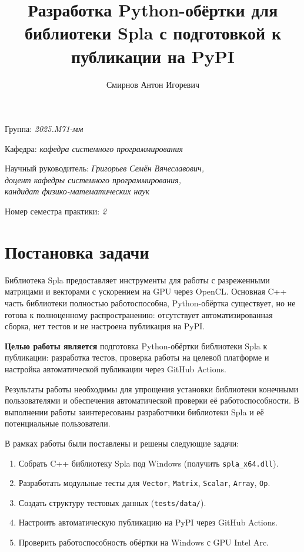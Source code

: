 \documentclass[a4paper]{article}
\title{Разработка Python-обёртки для библиотеки Spla с подготовкой к публикации на PyPI}
\author{Смирнов Антон Игоревич}
\date{}
\begin{document}
\maketitle

\begin{flushright}
    Группа: \emph{2025.M71-мм}

    Кафедра: \emph{кафедра системного программирования}

    Научный руководитель: \emph{Григорьев Семён Вячеславович,}\\
    \emph{доцент кафедры системного программирования,}\\
    \emph{кандидат физико-математических наук}

    Номер семестра практики: \emph{2}
\end{flushright}

\section{Постановка задачи}

Библиотека Spla \cite{spla} предоставляет инструменты для работы с разреженными матрицами и векторами с ускорением на GPU через OpenCL. Основная C++ часть библиотеки полностью работоспособна, Python-обёртка существует, но не готова к полноценному распространению: отсутствует автоматизированная сборка, нет тестов и не настроена публикация на PyPI.

\textbf{Целью работы является} подготовка Python-обёртки библиотеки Spla к публикации: разработка тестов, проверка работы на целевой платформе и настройка автоматической публикации через GitHub Actions.

Результаты работы необходимы для упрощения установки библиотеки конечными пользователями и обеспечения автоматической проверки её работоспособности. В выполнении работы заинтересованы разработчики библиотеки Spla и её потенциальные пользователи.

В рамках работы были поставлены и решены следующие задачи:
\begin{enumerate}
    \item Собрать C++ библиотеку Spla под Windows (получить \texttt{spla\_x64.dll}).
    \item Разработать модульные тесты для \texttt{Vector}, \texttt{Matrix}, \texttt{Scalar}, \texttt{Array}, \texttt{Op}.
    \item Создать структуру тестовых данных (\texttt{tests/data/}).
    \item Настроить автоматическую публикацию на PyPI через GitHub Actions.
    \item Проверить работоспособность обёртки на Windows с GPU Intel Arc.
\end{enumerate}
\end{document}

